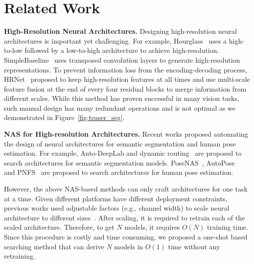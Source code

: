 \documentclass[final]{cvpr}
\begin{document}
 \section{Related Work}
\noindent\textbf{High-Resolution Neural Architectures.}
Designing high-resolution neural architectures is important yet challenging. For example, 
Hourglass~\cite{newell2016stacked} uses a high-to-low followed by a low-to-high architecture to achieve high-resolution.
SimpleBaseline~\cite{xiao2018simple} uses transposed convolution layers to generate high-resolution representations. 
To prevent information loss from the encoding-decoding process, HRNet~\cite{wang2020deep} proposed to keep high-resolution features at all times and use multi-scale feature fusion at the end of every four residual blocks to merge information from different scales. While this method has proven successful in many vision tasks, such manual design has many redundant operations and is not optimal as we demonstrated in Figure~\ref{fig:teaser_seg}. 

\noindent\textbf{NAS for High-resolution Architectures.}
Recent  works proposed automating the design of neural architectures for semantic segmentation and human pose estimation. For example, 
Auto-DeepLab and dynamic routing~\cite{li2020learning} are proposed to search architectures for semantic segmentation models. 
PoseNAS~\cite{bao2020pose}, AutoPose~\cite{gong2020autopose} and PNFS~\cite{yang2019pose} are proposed to search architectures for human pose estimation.

However, the above NAS-based methods can only craft architectures for one task at a time. Given different platforms have different deployment constraints, previous works used adjustable factors (e.g., channel width) to scale neural architecture to different sizes~\cite{wang2020deep}. After scaling, it is required to retrain each of the scaled architecture. Therefore, to get $N$ models, it requires $O(N)$ training time. 
Since this procedure is costly and time consuming, we proposed a one-shot based searching method that can derive $N$ models in $O(1)$ time without any retraining. 
 
\end{document}
